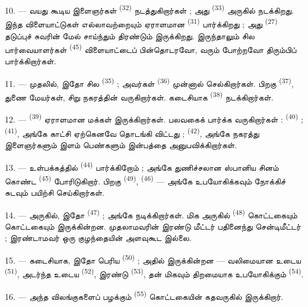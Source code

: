 10. --- வயது கூடிய இளைஞர்கள்  \textsuperscript{(32)}
நடத்துகிறார்கள் ; அது  \textsuperscript{(33)} அருகில்
நடக்கிறது. இந்த
விளையாட்டுகள் எல்லாவற்றையும் ஏராளமான 
\textsuperscript{(31)} பார்க்கிறது ; அது 
\textsuperscript{(27)} தடுப்புச் சுவரின் மேல் சாய்ந்தும் 
திரண்டும் இருக்கிறது. இருந்தாலும் சில பார்வையாளர்கள்  \textsuperscript{(45)} விளையாட்டைப் பின்தொடரவோ,  வரும்  போற்றவோ திரும்பிப்
பார்க்கிறார்கள்.

11. --- முதலில், இதோ சில  \textsuperscript{(35)} ; அவர்கள்
 \textsuperscript{(36)} முன்னால் செல்கிறார்கள்.
பிறகு  \textsuperscript{(37)}, துணை மேயர்கள், சிறு நகரத்தின்
 வருகிறார்கள். கடைசியாக 
\textsuperscript{(38)} நடக்கிறார்கள்.

\VUsaut{5.0mm}
\VUsaut{3.6mm}

12. ---  \textsuperscript{(39)} ஏராளமான மக்கள்
இருக்கிறார்கள். பலவகைக்  பார்க்க வருகிறார்கள் :
 \textsuperscript{(40)} ; 
\textsuperscript{(41)}, அங்கே காட்சி ஏற்கெனவே தொடங்கி விட்டது ;
 \textsuperscript{(42)}, அங்கே நகரத்து இளைஞர்களும்
இளம் பெண்களும்  இன்பத்தை அனுபவிக்கிறார்கள்.

13. --- உள்பக்கத்தில்  \textsuperscript{(44)}
பார்க்கிறோம் ; அங்கே துணிச்சலான ஸ்பானிய 
சினம் கொண்ட  \textsuperscript{(45)} போரிடுகிறார். பிறகு
 \textsuperscript{(49)}, 
\textsuperscript{(46)} — அங்கே  உபயோகிக்கவும்
 நோக்கிச் சுடவும் பயிற்சி செய்கிறார்கள்.

14. --- அருகில், இதோ  \textsuperscript{(47)} ;
அங்கே   நடிக்கிறார்கள்.
மிக அருகில்  \textsuperscript{(48)} கொட்டகையும்
 கொட்டகையும் இருக்கின்றன. முதலாமவரின்
 இரண்டு மீட்டர் பதினைந்து சென்டிமீட்டர் ; இரண்டாமவர்
ஒரு குழந்தையின் அளவுகூட இல்லை.

15. --- கடைசியாக, இதோ பெரிய 
\textsuperscript{(50)} ; அதில்  இருக்கின்றன —
வலிமையான  உடைய  \textsuperscript{(51)},
அடர்ந்த  உடைய  \textsuperscript{(52)},
இரண்டு  \textsuperscript{(53)}, தன்
 மிகவும் திறமையாக உபயோகிக்கும் 
\textsuperscript{(54)}.

16. --- அந்த விலங்குகளைப் பழக்கும் 
\textsuperscript{(55)} கொட்டகையின் கதவருகில் இருக்கிறார்.

\VUsaut{6.0mm}
\VUfilet{22mm}
